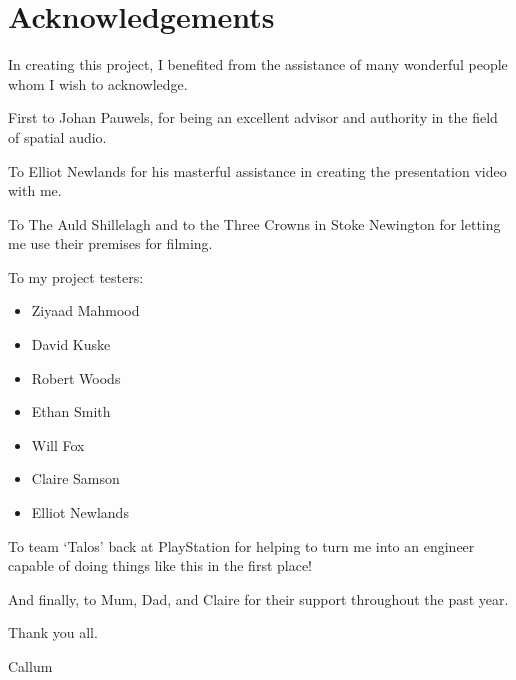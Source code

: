 \thispagestyle{plain}
\newpage
\appendix
\section{Acknowledgements}\label{sec:acknowledgements}

\normalsize

In creating this project, I benefited from the assistance of many wonderful people whom I wish to acknowledge.

First to Johan Pauwels, for being an excellent advisor and authority in the field of spatial audio.

To Elliot Newlands for his masterful assistance in creating the presentation video with me.

To The Auld Shillelagh and to the Three Crowns in Stoke Newington for letting me use their premises for filming.

To my project testers:

\begin{itemize}
    \item Ziyaad Mahmood
    \item David Kuske
    \item Robert Woods
    \item Ethan Smith
    \item Will Fox
    \item Claire Samson
    \item Elliot Newlands
\end{itemize}

To team `Talos'
back at PlayStation for helping to turn me into an engineer capable of doing things like this in the first place!

And finally, to Mum, Dad, and Claire for their support throughout the past year.

Thank you all.

Callum
